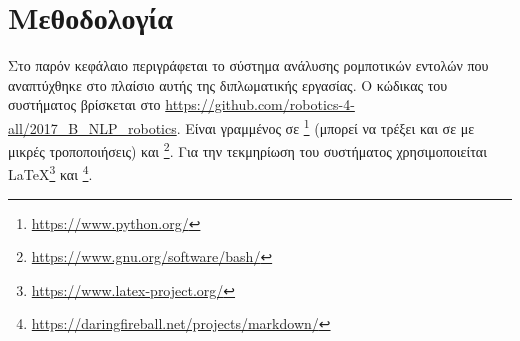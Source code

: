 \chapter{Μεθοδολογία}\label{chap:methodology}

Στο παρόν κεφάλαιο περιγράφεται το σύστημα ανάλυσης ρομποτικών εντολών \projectname{} που αναπτύχθηκε στο πλαίσιο αυτής της διπλωματικής εργασίας.
Ο κώδικας του συστήματος βρίσκεται στο \url{https://github.com/robotics-4-all/2017_B_NLP_robotics}.
Είναι γραμμένος σε \footnote{\url{https://www.python.org/}} (μπορεί να τρέξει και σε  με μικρές τροποποιήσεις)
και \footnote{\url{https://www.gnu.org/software/bash/}}.
Για την τεκμηρίωση του συστήματος χρησιμοποιείται \LaTeX{}\footnote{\url{https://www.latex-project.org/}} και \footnote{\url{https://daringfireball.net/projects/markdown/}}.

